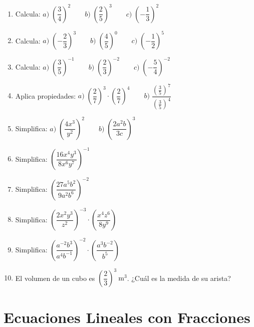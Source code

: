 \documentclass[12pt, letterpaper]{article}
\begin{document}
\begin{enumerate}[leftmargin=*, resume]
  \item \facil{} Calcula: $a) \; \left(\dfrac{3}{4}\right)^2 \qquad b) \; \left(\dfrac{2}{5}\right)^3 \qquad c) \; \left(-\dfrac{1}{3}\right)^2$

  \item \facil{} Calcula: $a) \; \left(-\dfrac{2}{3}\right)^3 \qquad b) \; \left(\dfrac{4}{5}\right)^0 \qquad c) \; \left(-\dfrac{1}{2}\right)^5$

  \item \facil{} Calcula: $a) \; \left(\dfrac{3}{5}\right)^{-1} \qquad b) \; \left(\dfrac{2}{3}\right)^{-2} \qquad c) \; \left(-\dfrac{5}{4}\right)^{-2}$

  \item \medio{} Aplica propiedades: $a) \; \left(\dfrac{2}{7}\right)^3 \cdot \left(\dfrac{2}{7}\right)^4 \qquad b) \; \dfrac{\left(\frac{3}{5}\right)^7}{\left(\frac{3}{5}\right)^4}$

  \item \medio{} Simplifica: $a) \; \left(\dfrac{4x^3}{y^2}\right)^2 \qquad b) \; \left(\dfrac{2a^2b}{3c}\right)^3$

  \item \medio{} Simplifica: $\left(\dfrac{16x^4y^3}{8x^6y^7}\right)^{-1}$

  \item \medio{} Simplifica: $\left(\dfrac{27a^5b^2}{9a^2b^6}\right)^{-2}$

  \item \dificil{} Simplifica: $\left(\dfrac{2x^2y^3}{z^2}\right)^{-3} \cdot \left(\dfrac{x^4z^6}{8y^9}\right)$

  \item \dificil{} Simplifica: $\left(\dfrac{a^{-2}b^3}{a^4b^{-1}}\right)^{-2} \cdot \left(\dfrac{a^3b^{-2}}{b^5}\right)$

  \item \dificil{} El volumen de un cubo es $\left(\dfrac{2}{3}\right)^3\ \text{m}^3$. ¿Cuál es la medida de su arista?
\end{enumerate}


\section{Ecuaciones Lineales con Fracciones}
\end{document}
